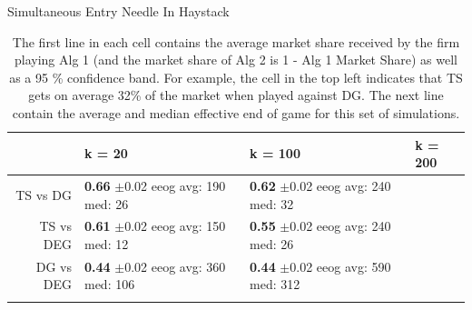 \documentclass{article}
\theoremstyle{definition}
\begin{document}
\begin{table}[ht]
\centering
\caption{Simultaneous Entry Needle In Haystack} 
\begin{tabular}{rlll}
  \hline
 & k = 20 & k = 100 & k = 200 \\ 
  \hline
TS vs DG & \makecell{\textbf{0.66} $\pm$0.02\\ eeog \\ avg: 190\\ med: 26} & \makecell{\textbf{0.62} $\pm$0.02\\ eeog \\ avg: 240\\ med: 32} &  \\ 
  TS vs DEG & \makecell{\textbf{0.61} $\pm$0.02\\ eeog \\ avg: 150\\ med: 12} & \makecell{\textbf{0.55} $\pm$0.02\\ eeog \\ avg: 240\\ med: 26} &  \\ 
  DG vs DEG & \makecell{\textbf{0.44} $\pm$0.02\\ eeog \\ avg: 360\\ med: 106} & \makecell{\textbf{0.44} $\pm$0.02\\ eeog \\ avg: 590\\ med: 312} &  \\ 
   \hline
   \label{hm_nih}
\end{tabular}
\caption*{\tiny{The first line in each cell contains the average market share received by the firm playing Alg 1 (and the market share of Alg 2 is 1 - Alg 1 Market Share) as well as a 95 \% confidence band. For example, the cell in the top left indicates that TS gets on average 32\% of the market when played against DG. The next line contain the average and median effective end of game for this set of simulations.}}
\end{table}
\end{document}
